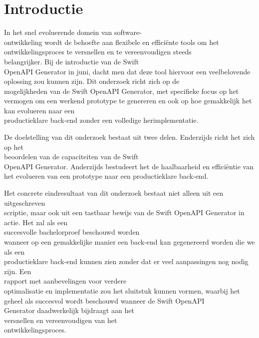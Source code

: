 
\section{Introductie}%
\label{sec:introductie}
In het snel evoluerende domein van software-\\ontwikkeling wordt de behoefte aan flexibele en efficiënte tools om het ontwikkelingsproces te versnellen en te vereenvoudigen steeds \\belangrijker. Bij de introductie van de Swift \\OpenAPI Generator in juni, dacht men dat deze tool hiervoor een veelbelovende oplossing zou kunnen zijn. Dit onderzoek richt zich op de \\mogelijkheden van de Swift OpenAPI Generator, met specifieke focus op het vermogen om een werkend prototype te genereren en ook op hoe gemakkelijk het kan evolueren naar een \\productieklare back-end zonder een volledige herimplementatie. 

De doelstelling van dit onderzoek bestaat uit twee delen. Enderzijds richt het zich op het \\beoordelen van de capaciteiten van de Swift \\OpenAPI Generator. Anderzijds bestudeert het de haalbaarheid en efficiëntie van het evolueren van een prototype naar een productieklare back-end. 

Het concrete eindresultaat van dit onderzoek bestaat niet alleen uit een uitgeschreven \\scriptie, maar ook uit een tastbaar bewijs van de Swift OpenAPI Generator in actie. Het zal als een \\succesvolle bachelorproef beschouwd worden \\wanneer op een gemakkelijke manier een back-end kan gegenereerd worden die we als een \\productieklare back-end kunnen zien zonder dat er veel aanpassingen nog nodig zijn. Een \\rapport met aanbevelingen voor verdere \\optimalisatie en implementatie zou het sluitstuk kunnen vormen, waarbij het geheel als succesvol wordt beschouwd wanneer de Swift OpenAPI \\Generator daadwerkelijk bijdraagt aan het \\versnellen en vereenvoudigen van het \\ontwikkelingsproces.  

